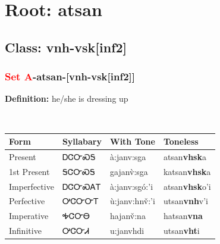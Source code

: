 \needspace{4in}
\section*{Root: atsan}
\nopagebreak
{}
\needspace{3in}
\subsection*{Class: vnh-vsk[inf2]}
\nopagebreak
\needspace{2in}
\subsubsection*{\textcolor{Red}{Set A}{-}\textbf{atsan}{-}[vnh-vsk[inf2]]}
\nopagebreak
\textbf{Definition: } he/she is dressing up
\\[0.5em]
\begin{tabularx}{\textwidth}{l X X X}%
\toprule%
\textbf{Form}&\textbf{Syllabary}&\textbf{With Tone}&\textbf{Toneless}\\%
\midrule%
Present&ᎠᏣᏅᏍᎦ&à:janv:sga&atsan\textbf{vhsk}a\\%
1st Present&ᎦᏣᏅᏍᎦ&gajanv̀:sga&katsan\textbf{vhsk}a\\%
Imperfective&ᎠᏣᏅᏍᎪᎢ&à:janv:sgó:’i&atsan\textbf{vhsk}o'i\\%
Perfective&ᎤᏣᏅᏅᎢ&ù:janv:hnv̌:’i&utsan\textbf{vnh}v'i\\%
Imperative&ᎭᏣᏅᎾ&hajanv̌:na&hatsan\textbf{vna}\\%
Infinitive&ᎤᏣᏅᏗ&u:janvhdi&utsan\textbf{vht}i\\%
\bottomrule%
\end{tabularx}
\\[1em]